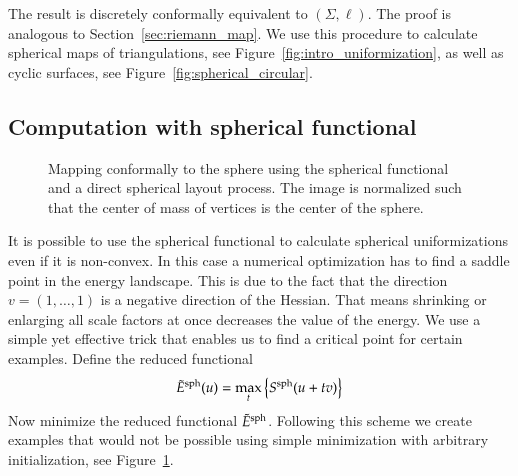 \documentclass[Thesis]{subfiles}
\begin{document}
The result is discretely conformally equivalent to $(\Sigma, \ell)$. The proof is analogous to Section~\ref{sec:riemann_map}.
We use this procedure to calculate spherical maps of triangulations, see Figure~\ref{fig:intro_uniformization}, as well as cyclic surfaces, see Figure~\ref{fig:spherical_circular}.


\subsection{Computation with spherical functional}
\label{sec:spherical_computation}

\begin{figure}
\centering
{}
\quad\quad\quad{}
\caption{Mapping conformally to the sphere using the spherical functional and a direct spherical layout process. The image is normalized such that the center of mass of vertices is the center of the sphere.}
\label{fig:spherical_examples}
\end{figure}

It is possible to use the spherical functional to calculate spherical uniformizations even if it is non-convex. In this case a numerical optimization has to find a saddle point in the energy landscape. This is due to the fact that the direction $v=(1,\ldots,1)$ is a negative direction of the Hessian. That means shrinking or enlarging all scale factors at once decreases the value of the energy. We use a simple yet effective trick that enables us to find a critical point for certain examples. Define the reduced functional
\begin{equation}
\label{eq:reduced_spherical}
\tilde E^{\rm sph}(u)=\max_t \left\{S^{\rm sph}(u + tv)\right\}
\end{equation}
Now minimize the reduced functional $\tilde  E^{\rm sph}$. 
Following this scheme we create examples that would not be possible using simple minimization with arbitrary initialization, see Figure~\ref{fig:spherical_examples}.
\end{document}
